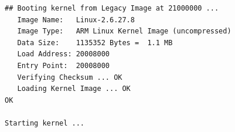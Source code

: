 \documentclass[a4paper,12pt]{book}
\begin{document}
				\begin{lstlisting}[basicstyle={\footnotesize\ttfamily}]
## Booting kernel from Legacy Image at 21000000 ...                             
   Image Name:   Linux-2.6.27.8                                                 
   Image Type:   ARM Linux Kernel Image (uncompressed)                          
   Data Size:    1135352 Bytes =  1.1 MB                                        
   Load Address: 20008000                                                       
   Entry Point:  20008000                                                       
   Verifying Checksum ... OK                                                    
   Loading Kernel Image ... OK                                                  
OK                                                                              
                                                                                
Starting kernel ...                                                             
                                                                                

\end{lstlisting}
\end{document}
